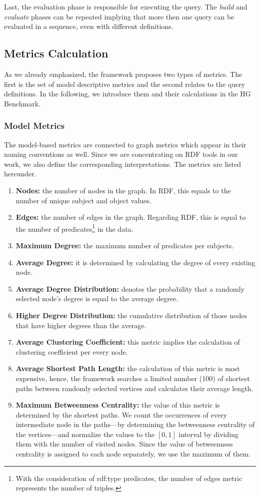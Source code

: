 Last, the evaluation phase is responsible for executing the query. The \emph{build} and \emph{evaluate} phases can be repeated implying that more then one query can be evaluated in a sequence, even with different definitions.

\subsection{Metrics Calculation}
As we already emphasized, the \framework framework proposes two types of metrics. The first is the set of model descriptive metrics and the second relates to the query definitions. In the following, we introduce them and their calculations in the HG Benchmark.

\subsubsection{Model Metrics}
The model-based metrics are connected to graph metrics which appear in their naming conventions as well. Since we are concentrating on RDF tools in our work, we also define the corresponding interpretations. The metrics are listed hereunder.
\begin{enumerate}
	\item{\textbf{Nodes:}} the number of nodes in the graph. In RDF, this equals to the number of unique subject and object values.
	\item{\textbf{Edges:}} the number of edges in the graph. Regarding RDF, this is equal to the number of predicates\footnote{With the consideration of \textsf{rdf:type} predicates, the number of edges metric represents the number of triples.} in the data.
	\item{\textbf{Maximum Degree:}} the maximum number of predicates per subjects.
	\item{\textbf{Average Degree:}} it is determined by calculating the degree of every existing node.
	\item{\textbf{Average Degree Distribution:}} denotes the probability that a randomly selected node’s degree is equal to the average degree.
	\item{\textbf{Higher Degree Distribution:}} the cumulative distribution of those nodes that have higher degrees than the average.
	\item{\textbf{Average Clustering Coefficient:}} this metric implies the calculation of clustering coefficient per every node.
	\item{\textbf{Average Shortest Path Length:}} the calculation of this metric is most expensive, hence, the framework searches a limited number (100) of shortest paths between randomly selected vertices and calculates their average length.
	\item{\textbf{Maximum Betweenness Centrality:}} the value of this metric is determined by the shortest paths. We count the occurrences of every intermediate node in the paths---by determining the betweenness centrality of the vertices---and normalize the values to the $[0,1]$ interval by dividing them with the number of visited nodes. Since the value of betweenness centrality is assigned to each node separately, we use the maximum of them.
\end{enumerate}

